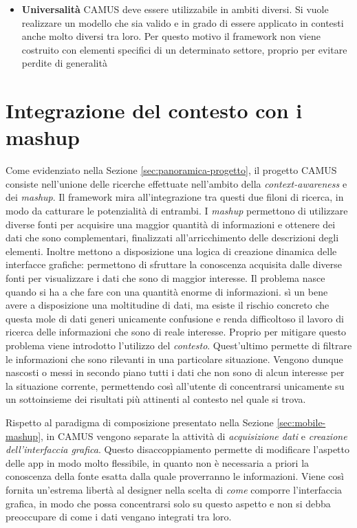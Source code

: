 \begin{itemize}
	\item \textbf{Universalità} CAMUS deve essere utilizzabile in ambiti diversi. Si vuole realizzare un modello che sia valido e in grado di essere applicato in contesti anche molto diversi tra loro. Per questo motivo il framework non viene costruito con elementi specifici di un determinato settore, proprio per evitare perdite di generalità
\end{itemize}

\section{Integrazione del contesto con i mashup\label{sec:integrazione-contesto-mashup}}

Come evidenziato nella Sezione \ref{sec:panoramica-progetto}, il progetto CAMUS consiste nell'unione delle ricerche effettuate nell'ambito della \emph{context-awareness} e dei \emph{mashup}. Il framework mira all'integrazione tra questi due filoni di ricerca, in modo da catturare le potenzialità di entrambi. I \emph{mashup} permettono di utilizzare diverse fonti per acquisire una maggior quantità di informazioni e ottenere dei dati che sono complementari, finalizzati all'arricchimento delle descrizioni degli elementi. Inoltre mettono a disposizione una logica di creazione dinamica delle interfacce grafiche: permettono di sfruttare la conoscenza acquisita dalle diverse fonti per visualizzare i dati che sono di maggior interesse. Il problema nasce quando si ha a che fare con una quantità enorme di informazioni. \upe sì un bene avere a disposizione una moltitudine di dati, ma esiste il rischio concreto che questa mole di dati generi unicamente confusione e renda difficoltoso il lavoro di ricerca delle informazioni che sono di reale interesse. Proprio per mitigare questo problema viene introdotto l'utilizzo del \emph{contesto}. Quest'ultimo permette di filtrare le informazioni che sono rilevanti in una particolare situazione. Vengono dunque nascosti o messi in secondo piano tutti i dati che non sono di alcun interesse per la situazione corrente, permettendo così all'utente di concentrarsi unicamente su un sottoinsieme dei risultati più attinenti al contesto nel quale si trova.

Rispetto al paradigma di composizione presentato nella Sezione \ref{sec:mobile-mashup}, in CAMUS vengono separate la attività di \emph{acquisizione dati} e \emph{creazione dell'interfaccia grafica}. Questo disaccoppiamento permette di modificare l'aspetto delle app in modo molto flessibile, in quanto non è necessaria a priori la conoscenza della fonte esatta dalla quale proverranno le informazioni. Viene così fornita un'estrema libertà al designer nella scelta di \emph{come} comporre l'interfaccia grafica, in modo che possa concentrarsi solo su questo aspetto e non si debba preoccupare di come i dati vengano integrati tra loro.

